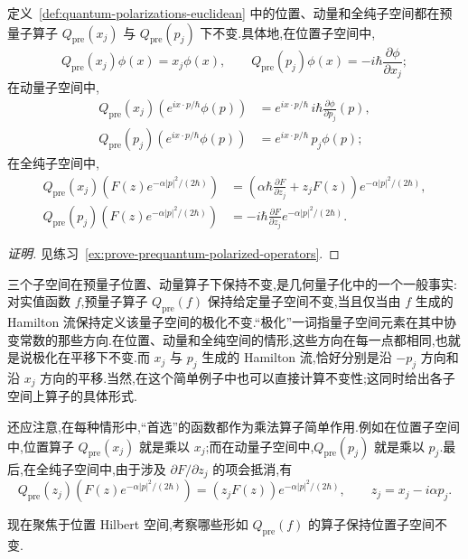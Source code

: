 \begin{proposition}[位置、动量与全纯子空间的不变性]
\label{prop:quantum-position-momentum-operators}
定义~\ref{def:quantum-polarizations-euclidean} 中的位置、动量和全纯子空间都在预量子算子 $Q_{\mathrm{pre}}(x_j)$ 与 $Q_{\mathrm{pre}}(p_j)$ 下不变.具体地,在位置子空间中,
\[
 Q_{\mathrm{pre}}(x_j)\phi(x)=x_j\phi(x),
 \qquad
 Q_{\mathrm{pre}}(p_j)\phi(x)=-i\hbar\frac{\partial\phi}{\partial x_j};
\]
在动量子空间中,
\[
 \begin{aligned}
 Q_{\mathrm{pre}}(x_j)(e^{ix\cdot p/\hbar}\phi(p))
 &=e^{ix\cdot p/\hbar}\,i\hbar\frac{\partial\phi}{\partial p_j}(p),\\
 Q_{\mathrm{pre}}(p_j)(e^{ix\cdot p/\hbar}\phi(p))
 &=e^{ix\cdot p/\hbar}\,p_j\phi(p);
 \end{aligned}
\]
在全纯子空间中,
\[
 \begin{aligned}
 Q_{\mathrm{pre}}(x_j)(F(z)e^{-\alpha|p|^2/(2\hbar)})
 &=\left(\alpha\hbar\frac{\partial F}{\partial z_j}+z_jF(z)\right)e^{-\alpha|p|^2/(2\hbar)},\\
 Q_{\mathrm{pre}}(p_j)(F(z)e^{-\alpha|p|^2/(2\hbar)})
 &=-i\hbar\frac{\partial F}{\partial z_j}e^{-\alpha|p|^2/(2\hbar)}.
 \end{aligned}
\]
\end{proposition}

\begin{proof}[证明]
见练习~\ref{ex:prove-prequantum-polarized-operators}.
\end{proof}

三个子空间在预量子位置、动量算子下保持不变,是几何量子化中的一个一般事实:对实值函数 $f$,预量子算子 $Q_{\mathrm{pre}}(f)$ 保持给定量子空间不变,当且仅当由 $f$ 生成的 Hamilton 流保持定义该量子空间的极化不变.“极化”一词指量子空间元素在其中协变常数的那些方向.在位置、动量和全纯空间的情形,这些方向在每一点都相同,也就是说极化在平移下不变.而 $x_j$ 与 $p_j$ 生成的 Hamilton 流,恰好分别是沿 $-p_j$ 方向和沿 $x_j$ 方向的平移.当然,在这个简单例子中也可以直接计算不变性;这同时给出各子空间上算子的具体形式.

还应注意,在每种情形中,“首选”的函数都作为乘法算子简单作用.例如在位置子空间中,位置算子 $Q_{\mathrm{pre}}(x_j)$ 就是乘以 $x_j$;而在动量子空间中,$Q_{\mathrm{pre}}(p_j)$ 就是乘以 $p_j$.最后,在全纯子空间中,由于涉及 $\partial F/\partial z_j$ 的项会抵消,有
\[
 Q_{\mathrm{pre}}(z_j)\left(F(z)e^{-\alpha|p|^2/(2\hbar)}\right)
 =(z_jF(z))e^{-\alpha|p|^2/(2\hbar)},
 \qquad z_j=x_j-i\alpha p_j.
\]

现在聚焦于位置 Hilbert 空间,考察哪些形如 $Q_{\mathrm{pre}}(f)$ 的算子保持位置子空间不变.

